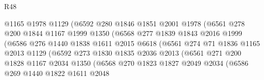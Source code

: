 \begin{lexlean}{R48}
\begin{coremodule}
                            @1165
                            @1978
                            @1129
                            (@6592
                              @280
                              @1846
                              @1851
                              @2001
                              @1978
                              (@6561
                                @278
                                @200
                                @1844
                                @1167
                                @1999
                                @1350
                                (@6568
                                  @277
                                  @1839
                                  @1843
                                  @2016
                                  @1999
                                  (@6586
                                    @276
                                    @1440
                                    @1838
                                    @1611
                                    @2015
                                    @6618
                                    (@6561
                                      @274
                                      @71
                                      @1836
                                      @1165
                                      @2013
                                      @1129
                                      (@6592
                                        @273
                                        @1830
                                        @1835
                                        @2036
                                        @2013
                                        (@6561
                                          @271
                                          @200
                                          @1828
                                          @1167
                                          @2034
                                          @1350
                                          (@6568
                                            @270
                                            @1823
                                            @1827
                                            @2049
                                            @2034
                                            (@6586
                                              @269
                                              @1440
                                              @1822
                                              @1611
                                              @2048

\end{coremodule}
\end{lexlean}
